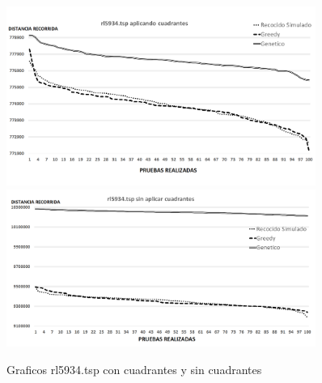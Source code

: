  \begin{figure}[hbtp]
    \centering
        \includegraphics[width=0.9\textwidth]{PruebasResultados/Experimentos_Graficos_Con/rl5934.png}
        \includegraphics[width=0.9\textwidth]{PruebasResultados/Experimentos_Graficos_Sin/rl5934.png}
        \caption{Graficos rl5934.tsp con cuadrantes y sin cuadrantes}
        \label{fig:rl5934_grafica.png}
\end{figure}
\newpage


